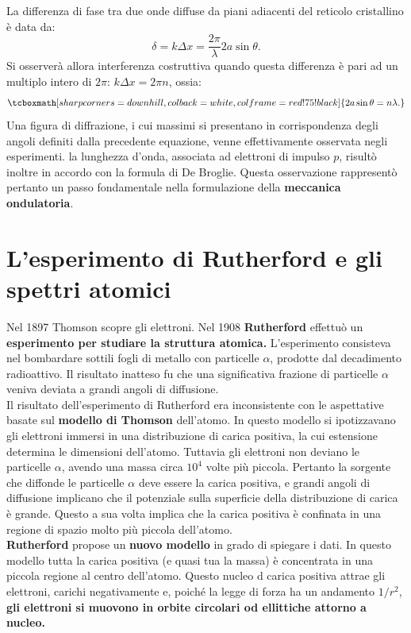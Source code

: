 \newpage
La differenza di fase tra due onde diffuse  da piani adiacenti del reticolo cristallino è data da:
	\begin{equation}
		\delta = k \Delta x = \frac{2 \pi}{\lambda} 2a \sin \theta.
	\end{equation}
Si osserverà allora interferenza costruttiva quando questa differenza è pari ad un multiplo intero di $2 \pi$: $k \Delta x = 2 \pi n$, ossia:
	\begin{equation}
		\tcboxmath[sharp corners=downhill ,colback=white,colframe=red!75!black]{
			2a \sin \theta = n\lambda.
			}
	\end{equation}
Una figura di diffrazione, i cui massimi si presentano in corrispondenza degli angoli definiti dalla precedente equazione, venne effettivamente osservata negli esperimenti. la lunghezza d'onda, associata ad elettroni di impulso $p$, risultò inoltre in accordo con la formula di De Broglie. Questa osservazione rappresentò pertanto un passo fondamentale nella formulazione della \textbf{meccanica ondulatoria}.
\section{L'esperimento di Rutherford e gli spettri atomici}
Nel 1897 Thomson scopre gli elettroni. Nel 1908 \textbf{Rutherford} effettuò un \textbf{esperimento per studiare la struttura atomica.} L'esperimento consisteva nel bombardare sottili fogli di metallo con particelle $\alpha$, prodotte dal decadimento radioattivo. Il risultato inatteso fu che una significativa frazione di particelle $\alpha$ veniva deviata a grandi angoli di diffusione.\\

Il risultato dell'esperimento di Rutherford era inconsistente con le aspettative basate sul \textbf{modello di Thomson} dell'atomo. In questo modello si ipotizzavano gli elettroni immersi in una distribuzione di carica positiva, la cui estensione determina le dimensioni dell'atomo. Tuttavia gli elettroni non deviano le particelle $\alpha$, avendo una massa circa $10^4$ volte più piccola. Pertanto la sorgente che diffonde le particelle $\alpha$ deve essere la carica positiva, e grandi angoli di diffusione implicano che il potenziale sulla superficie della distribuzione di carica è grande. Questo a sua volta implica che la carica positiva è confinata in una regione di spazio molto più piccola dell'atomo.\\

\textbf{Rutherford} propose un \textbf{nuovo modello} in grado di spiegare i dati. In questo modello tutta la carica positiva (e quasi tua la massa) è concentrata in una piccola regione al centro dell'atomo. Questo nucleo d carica positiva attrae gli elettroni, carichi negativamente e, poiché la legge di forza ha un andamento $1/r^2$, \textbf{gli elettroni si muovono in orbite circolari od ellittiche attorno a nucleo.}\\

